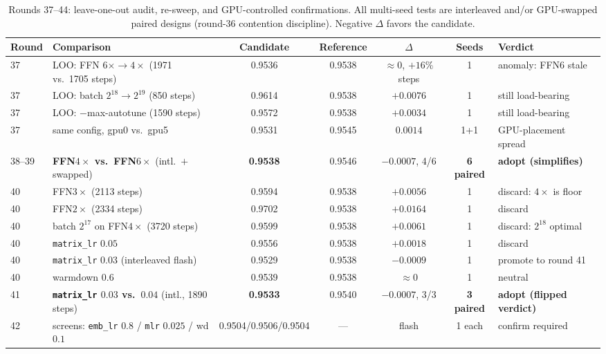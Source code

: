 \documentclass{article}
\begin{document}
\begin{table}[t]
\caption{Rounds 37--44: leave-one-out audit, re-sweep, and GPU-controlled confirmations. All multi-seed tests are interleaved and/or GPU-swapped paired designs (round-36 contention discipline). Negative $\Delta$ favors the candidate.}
\label{tab:results}
\vskip 0.15in
\begin{center}
\begin{scriptsize}
\setlength{\tabcolsep}{1.7pt}
\begin{tabular}{llccccl}
\toprule
Round & Comparison & Candidate & Reference & $\Delta$ & Seeds & Verdict \\
\midrule
37 & LOO: FFN $6\times \rightarrow 4\times$ (1971 vs.\ 1705 steps) & 0.9536 & 0.9538 & $\approx 0$, $+16\%$ steps & 1 & anomaly: FFN6 stale \\
37 & LOO: batch $2^{18} \rightarrow 2^{19}$ (850 steps) & 0.9614 & 0.9538 & $+0.0076$ & 1 & still load-bearing \\
37 & LOO: $-$max-autotune (1590 steps) & 0.9572 & 0.9538 & $+0.0034$ & 1 & still load-bearing \\
37 & same config, gpu0 vs.\ gpu5 & 0.9531 & 0.9545 & $0.0014$ & 1{+}1 & GPU-placement spread \\
\midrule
38--39 & \textbf{FFN$4\times$ vs.\ FFN$6\times$} (intl.\ $+$ swapped) & \textbf{0.9538} & 0.9546 & $-0.0007$, 4/6 & \textbf{6 paired} & \textbf{adopt (simplifies)} \\
40 & FFN$3\times$ (2113 steps) & 0.9594 & 0.9538 & $+0.0056$ & 1 & discard: $4\times$ is floor \\
40 & FFN$2\times$ (2334 steps) & 0.9702 & 0.9538 & $+0.0164$ & 1 & discard \\
40 & batch $2^{17}$ on FFN$4\times$ (3720 steps) & 0.9599 & 0.9538 & $+0.0061$ & 1 & discard: $2^{18}$ optimal \\
40 & \texttt{matrix\_lr} $0.05$ & 0.9556 & 0.9538 & $+0.0018$ & 1 & discard \\
40 & \texttt{matrix\_lr} $0.03$ (interleaved flash) & 0.9529 & 0.9538 & $-0.0009$ & 1 & promote to round 41 \\
40 & warmdown $0.6$ & 0.9539 & 0.9538 & $\approx 0$ & 1 & neutral \\
\midrule
41 & \textbf{\texttt{matrix\_lr} $0.03$ vs.\ $0.04$} (intl., 1890 steps) & \textbf{0.9533} & 0.9540 & $-0.0007$, 3/3 & \textbf{3 paired} & \textbf{adopt (flipped verdict)} \\
\midrule
42 & screens: \texttt{emb\_lr} $0.8$ / \texttt{mlr} $0.025$ / wd $0.1$ & 0.9504/0.9506/0.9504 & --- & flash & 1 each & confirm required \\

\end{tabular}
\end{scriptsize}
\end{center}
\end{table}
\end{document}
